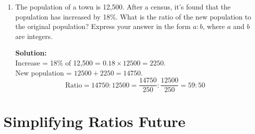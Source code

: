 \documentclass[12pt,a4paper]{article}
\begin{document}
\begin{enumerate}
\begin{enumerate}
    \textbf{Solution:}
    \[
    45 : 20 : 35 = \frac{45}{5} : \frac{20}{5} : \frac{35}{5} = 9:4:7
    \]
    \end{enumerate}

\item The population of a town is 12,500. After a census, it's found that the population has increased by 18\%. What is the ratio of the new population to the original population? Express your answer in the form \( a : b \), where \( a \) and \( b \) are integers.

\textbf{Solution:}\\
Increase = 18\% of 12,500 = \( 0.18 \times 12500 = 2250 \).\\
New population = \( 12500 + 2250 = 14750 \).\\
\[
\text{Ratio} = 14750 : 12500 = \frac{14750}{250} : \frac{12500}{250} = 59:50
\]

\end{enumerate}

\section*{Simplifying Ratios Future}
\end{document}
